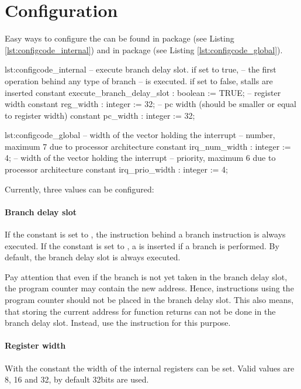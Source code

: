 \section{Configuration}
\label{sec:config}
Easy ways to configure the \procname can be found in package  (see Listing \ref{lst:configcode_internal}) and in package  (see Listing \ref{lst:configcode_global}).

\begin{vhdl}{lst:configcode_internal}
-- execute branch delay slot. if set to true,
-- the first operation behind any type of branch
-- is executed. if set to false, stalls are inserted
constant execute_branch_delay_slot : boolean := TRUE;
-- register width
constant reg_width                 : integer := 32;
-- pc width (should be smaller or equal to register width)
constant pc_width                  : integer := 32;
\end{vhdl}

\begin{vhdl}{lst:configcode_global}
-- width of the vector holding the interrupt
-- number, maximum 7 due to processor architecture
constant irq_num_width             : integer := 4;
-- width of the vector holding the interrupt
-- priority, maximum 6 due to processor architecture
constant irq_prio_width            : integer := 4;
\end{vhdl}

Currently, three values can be configured:
\paragraph{Branch delay slot}
\label{sec:branchdelayslot}
If the constant  is set to , the instruction behind a branch instruction is always executed.
If the constant is set to , a  is inserted if a branch is performed.
By default, the branch delay slot is always executed.

Pay attention that even if the branch is not yet taken in the branch delay slot, the program counter may contain the new address.
Hence, instructions using the program counter should not be placed in the branch delay slot.
This also means, that storing the current address for function returns can not be done in the branch delay slot.
Instead, use the  instruction for this purpose.
\paragraph{Register width}
With the constant  the width of the internal registers can be set. Valid values are 8, 16 and 32, by default 32bits are used.
